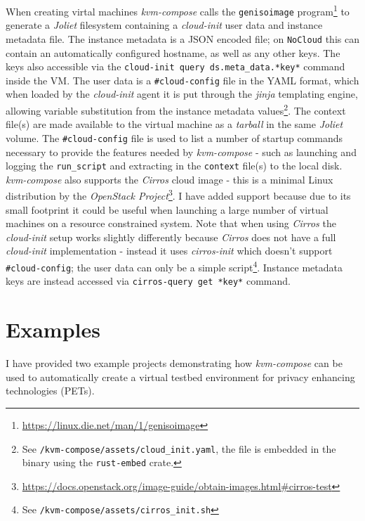\documentclass[
    author={Jacob Daniel Halsey},
    supervisor={Prof. Awais Rashid},
    degree={BSc},
    title={Building a Testbed for Evaluating Privacy Enhancing Technologies  (PETs)},
    subtitle={},
    type={software development},
    year={2021}
]{dissertation}
\begin{document}
When creating virtal machines \emph{kvm-compose} calls the \texttt{genisoimage} program\footnote{\url{https://linux.die.net/man/1/genisoimage}}
to generate a \emph{Joliet} filesystem containing a \emph{cloud-init} user data and instance metadata file.
The instance metadata is a JSON encoded file; on \texttt{NoCloud} this can contain an automatically configured
hostname, as well as any other keys. 
The keys also accessible via the \texttt{cloud-init query ds.meta\_data.*key*} command inside the VM.
The user data is a \texttt{\#cloud-config} file in the YAML format, which when loaded by the \emph{cloud-init}
agent it is put through the \emph{jinja} templating engine, allowing variable substitution from the instance
metadata values\footnote{See \texttt{/kvm-compose/assets/cloud\_init.yaml}, the file is embedded in the binary
using the \texttt{rust-embed} crate.}.
The context file(s) are made available to the virtual machine as a \emph{tarball} in the same \emph{Joliet} volume.
The \texttt{\#cloud-config} file is used to list a number of startup commands
necessary to provide the features
needed by \emph{kvm-compose} - such as launching and logging the \texttt{run\_script} and extracting in
the \texttt{context} file(s) to the local disk.\\

\emph{kvm-compose} also supports the \emph{Cirros} cloud image - this is a minimal Linux distribution
by the \emph{OpenStack Project}\footnote{\url{https://docs.openstack.org/image-guide/obtain-images.html\#cirros-test}}.
I have added support because due to its small footprint it could be useful when launching a large 
number of virtual machines on a resource constrained system.
Note that when using \emph{Cirros} the \emph{cloud-init} setup works slightly differently because \emph{Cirros}
does not have a full \emph{cloud-init} implementation - instead it uses \emph{cirros-init} which doesn't support
\texttt{\#cloud-config}; the user data can only be a simple 
script\footnote{See \texttt{/kvm-compose/assets/cirros\_init.sh}}.
Instance metadata keys are instead accessed via \texttt{cirros-query get *key*} command.

\section{Examples}

I have provided two example projects demonstrating how \emph{kvm-compose} can be used to automatically
create a virtual testbed environment for privacy enhancing technologies (PETs).
\end{document}
